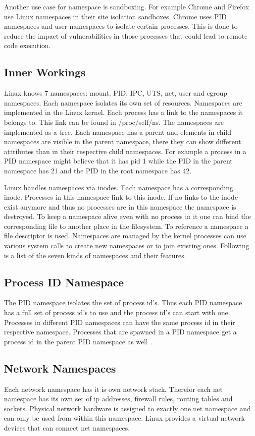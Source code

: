 \documentclass[10pt,twocolumn,a4paper]{article}
\begin{document}
Another use case for namespace is sandboxing. For example Chrome and Firefox use Linux namespaces
in their site isolation sandboxes. 
Chrome uses PID namespaces and user namespaces to isolate certain processes.
This is done to reduce the impact of vulnerabilities in those processes that could lead to remote code execution.


\subsection{Inner Workings}
Linux knows 7 namespaces: mount, PID, IPC, UTS, net, user and cgroup namespaces. Each namespace isolates its own set of resources. Namespaces are implemented in the Linux kernel.
Each process has a link to the namespaces it belongs to. This link can be found in /proc/self/ns\cite{8}. The namespaces are implemented as a tree. Each namespace has a parent and 
elements in child namespaces are visible in the parent namespace, there they can show different
attributes than in their respective child namespaces. For example a process in a PID namespace might 
believe that it has pid 1 while the PID in the parent namespace has 21 and the PID in the root
namespace has 42.

Linux handles namespaces via inodes. Each namespace has a corresponding inode. Processes in this
namespace link to this inode. If no links to the inode exist anymore and thus no processes are in
this namespace the namespace is destroyed. To keep a namespace alive even with no process in it
one can bind the corresponding file to another place in the filesystem. To reference a namespace a
file descriptor is used. Namespaces are managed by the kernel processes can use various system
calls to create new namespaces or to join existing ones.\cite{8} Following is a list of the seven
kinds of namespaces and their features.


\subsection{Process ID Namespace}
The PID namespace isolates the set of process id's. 
Thus each PID namespace has a full set of process id's to use and  the process id's can start with one.
Processes in different PID namespaces can have the same process id in their respective namespace. 
Processes that are spawned in a PID namespace get a process id in the parent PID namespace as well 
\cite{11}.

\subsection{Network Namespaces}
Each network namespace has it is own network stack. Therefor each net namespace has its own set of ip
addresses, firewall rules, routing tables and sockets. Physical network hardware is assigned to exactly one
net namespace and can only be used from within this namespace. Linux provides a virtual network
devices that can connect net namespaces.\cite{10}
\end{document}

